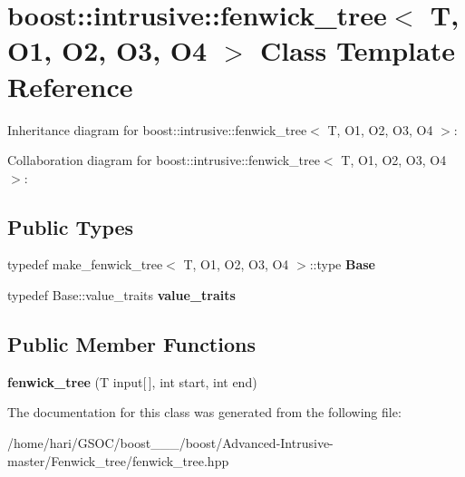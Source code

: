 \hypertarget{classboost_1_1intrusive_1_1fenwick__tree}{}\section{boost\+:\+:intrusive\+:\+:fenwick\+\_\+tree$<$ T, O1, O2, O3, O4 $>$ Class Template Reference}
\label{classboost_1_1intrusive_1_1fenwick__tree}


Inheritance diagram for boost\+:\+:intrusive\+:\+:fenwick\+\_\+tree$<$ T, O1, O2, O3, O4 $>$\+:


Collaboration diagram for boost\+:\+:intrusive\+:\+:fenwick\+\_\+tree$<$ T, O1, O2, O3, O4 $>$\+:
\subsection*{Public Types}
\begin{DoxyCompactItemize}
\item 
\mbox{\label{classboost_1_1intrusive_1_1fenwick__tree_a1ea48121b592add95278c215771b0f96}} 
typedef make\+\_\+fenwick\+\_\+tree$<$ T, O1, O2, O3, O4 $>$\+::type {\bfseries Base}
\item 
\mbox{\label{classboost_1_1intrusive_1_1fenwick__tree_aa7fcc6f3fabb763e2aed47bc0f0a073c}} 
typedef Base\+::value\+\_\+traits {\bfseries value\+\_\+traits}
\end{DoxyCompactItemize}
\subsection*{Public Member Functions}
\begin{DoxyCompactItemize}
\item 
\mbox{\label{classboost_1_1intrusive_1_1fenwick__tree_a81e92c61c222ef9e6b3bec3a11d6b177}} 
{\bfseries fenwick\+\_\+tree} (T input\mbox{[}$\,$\mbox{]}, int start, int end)
\end{DoxyCompactItemize}


The documentation for this class was generated from the following file\+:\begin{DoxyCompactItemize}
\item 
/home/hari/\+G\+S\+O\+C/boost\+\_\+\_\+\_/boost/\+Advanced-\/\+Intrusive-\/master/\+Fenwick\+\_\+tree/fenwick\+\_\+tree.\+hpp\end{DoxyCompactItemize}
